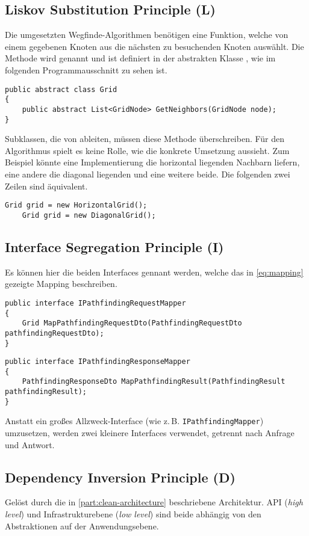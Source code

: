 \subsection{Liskov Substitution Principle (L)} \label{sec:lsp}
Die umgesetzten Wegfinde-Algorithmen benötigen eine
Funktion, welche von einem gegebenen Knoten aus die nächsten zu besuchenden
Knoten auswählt. Die Methode wird 
genannt und ist definiert in der abstrakten Klasse ,
wie im folgenden Programmausschnitt zu sehen ist.
\begin{lstlisting}[caption={\textbf{Grid} Entität},label={code:grid-entity}]
public abstract class Grid
{
    public abstract List<GridNode> GetNeighbors(GridNode node);
}
\end{lstlisting}
Subklassen, die von  ableiten, müssen diese Methode überschreiben.
Für den Algorithmus spielt es keine Rolle, wie die konkrete Umsetzung aussieht.
Zum Beispiel könnte eine Implementierung die horizontal liegenden Nachbarn liefern,
eine andere die diagonal liegenden und eine weitere beide. Die folgenden zwei Zeilen sind äquivalent.
\begin{lstlisting}[caption={Abstraktion des Gitters}]
    Grid grid = new HorizontalGrid();
    Grid grid = new DiagonalGrid();
\end{lstlisting}

\subsection{Interface Segregation Principle (I)}
Es können hier die beiden Interfaces gennant werden, welche das in \autoref{eq:mapping}
gezeigte Mapping beschreiben.
\begin{lstlisting}[caption={Request Mapper}]
public interface IPathfindingRequestMapper
{
    Grid MapPathfindingRequestDto(PathfindingRequestDto pathfindingRequestDto);
}
\end{lstlisting}
\begin{lstlisting}[caption={Response Mapper}]
public interface IPathfindingResponseMapper
{
    PathfindingResponseDto MapPathfindingResult(PathfindingResult pathfindingResult);
}
\end{lstlisting}
Anstatt ein großes Allzweck-Interface (wie z.\,B. \lstinline{IPathfindingMapper})
umzusetzen, werden zwei kleinere Interfaces verwendet, getrennt nach Anfrage und Antwort.

\subsection{Dependency Inversion Principle (D)}
Gelöst durch die in \autoref{part:clean-architecture} beschriebene Architektur.
API (\textit{high level}) und Infrastrukturebene (\textit{low level})
sind beide abhängig von den Abstraktionen auf der Anwendungsebene.

